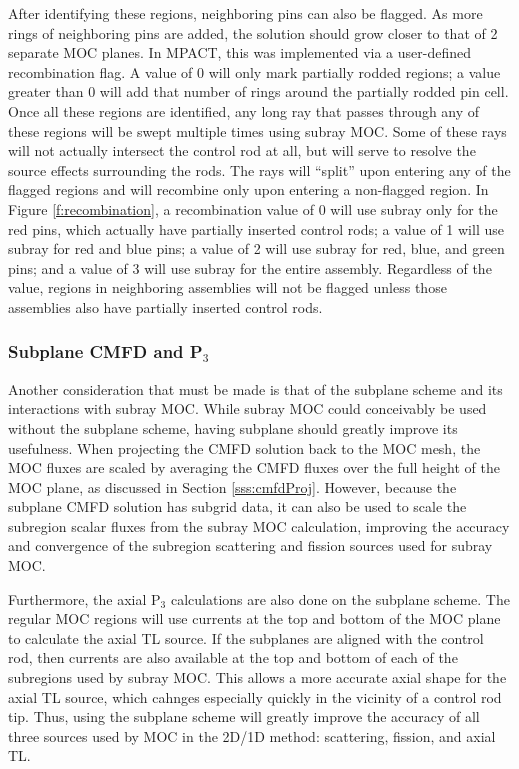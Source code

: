 After identifying these regions, neighboring pins can also be flagged.  As more rings of neighboring pins are added, the solution should grow closer to that of 2 separate MOC planes.  In MPACT, this was implemented via a user-defined recombination flag.  A value of 0 will only mark partially rodded regions; a value greater than 0 will add that number of rings around the partially rodded pin cell.  Once all these regions are identified, any long ray that passes through any of these regions will be swept multiple times using subray MOC.  Some of these rays will not actually intersect the control rod at all, but will serve to resolve the source effects surrounding the rods.  The rays will ``split'' upon entering any of the flagged regions and will recombine only upon entering a non-flagged region.  In Figure \ref{f:recombination}, a recombination value of 0 will use subray only for the red pins, which actually have partially inserted control rods; a value of 1 will use subray for red and blue pins; a value of 2 will use subray for red, blue, and green pins; and a value of 3 will use subray for the entire assembly.  Regardless of the value, regions in neighboring assemblies will not be flagged unless those assemblies also have partially inserted control rods.

\subsubsection{Subplane CMFD and \texorpdfstring{P$_3$}{P3}}

Another consideration that must be made is that of the subplane scheme and its interactions with subray MOC.  While subray MOC could conceivably be used without the subplane scheme, having subplane should greatly improve its usefulness.  When projecting the CMFD solution back to the MOC mesh, the MOC fluxes are scaled by averaging the CMFD fluxes over the full height of the MOC plane, as discussed in Section \ref{sss:cmfdProj}.  However, because the subplane CMFD solution has subgrid data, it can also be used to scale the subregion scalar fluxes from the subray MOC calculation, improving the accuracy and convergence of the subregion scattering and fission sources used for subray MOC.

Furthermore, the axial P$_3$ calculations are also done on the subplane scheme.  The regular MOC regions will use currents at the top and bottom of the MOC plane to calculate the axial TL source.  If the subplanes are aligned with the control rod, then currents are also available at the top and bottom of each of the subregions used by subray MOC.  This allows a more accurate axial shape for the axial TL source, which cahnges especially quickly in the vicinity of a control rod tip.  Thus, using the subplane scheme will greatly improve the accuracy of all three sources used by MOC in the 2D/1D method: scattering, fission, and axial TL.

